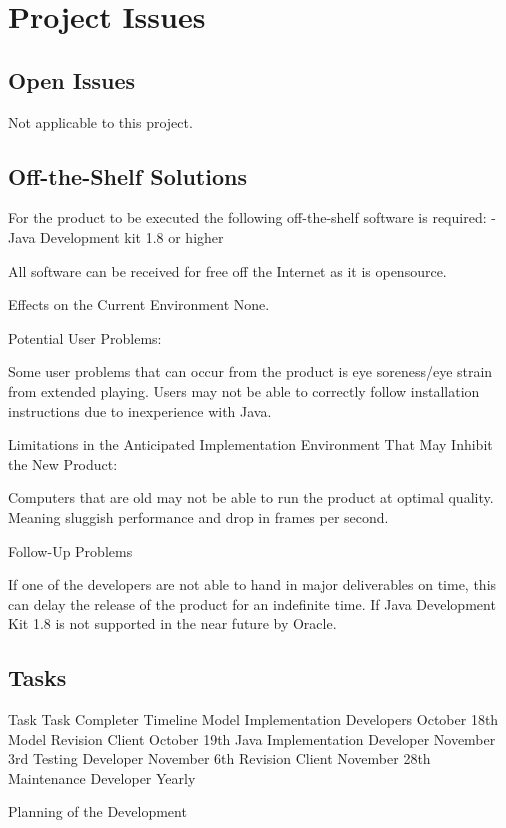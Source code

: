 \documentclass[12pt, titlepage]{article}
\begin{document}
\section{Project Issues}
\subsection{Open Issues}
Not applicable to this project.

\subsection{Off-the-Shelf Solutions}
For the product to be executed the following off-the-shelf software is required: 
-Java Development kit 1.8 or higher

All software can be received for free off the Internet as it is opensource.

Effects on the Current Environment 
None.

Potential User Problems:

Some user problems that can occur from the product is eye soreness/eye strain from extended playing. Users may not be able to correctly follow installation instructions due to inexperience with Java.

Limitations in the Anticipated Implementation Environment That May Inhibit the New Product:

Computers that are old may not be able to run the product at optimal quality. Meaning sluggish performance and drop in frames per second.

Follow-Up Problems 

If one of the developers are not able to hand in major deliverables on time, this can delay the release of the product for an indefinite time. If Java Development Kit 1.8 is not supported in the near future by Oracle.

\subsection{Tasks}

Task
Task Completer 
Timeline
Model Implementation
Developers
October 18th
Model Revision
Client
October 19th
Java Implementation
Developer
November 3rd
Testing
Developer
November 6th
Revision
Client
November 28th
Maintenance
Developer
Yearly

Planning of the Development 
\end{document}
